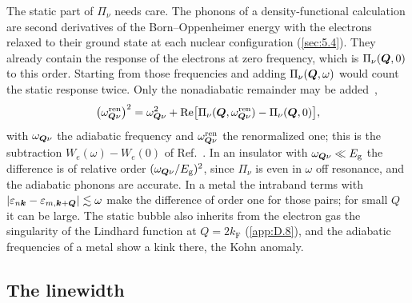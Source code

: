 The static part of $\Pi_\nu$ needs care. The phonons of a density-functional calculation are second derivatives of the Born--Oppenheimer energy with the electrons relaxed to their ground state at each nuclear configuration (\cref{sec:5.4}). They already contain the response of the electrons at zero frequency, which is $\Pi_\nu(\bm{Q},0)$ to this order. Starting from those frequencies and adding $\Pi_\nu(\bm{Q},\omega)$ would count the static response twice. Only the nonadiabatic remainder may be added~\cite{calandra2010adiabatic},
\begin{equation}
  \bigl(\omega^{\mathrm{ren}}_{\bm{Q}\nu}\bigr)^2 = \omega_{\bm{Q}\nu}^2 + \operatorname{Re}\bigl[\Pi_\nu(\bm{Q},\omega^{\mathrm{ren}}_{\bm{Q}\nu}) - \Pi_\nu(\bm{Q},0)\bigr] ,
  \label{eq:D.17-nonad}
\end{equation}
with $\omega_{\bm{Q}\nu}$ the adiabatic frequency and $\omega^{\mathrm{ren}}_{\bm{Q}\nu}$ the renormalized one; this is the subtraction $W_e(\omega) - W_e(0)$ of Ref.~\cite[Eq.~(140)]{giustino2017electron}. In an insulator with $\omega_{\bm{Q}\nu} \ll E_{\mathrm{g}}$ the difference is of relative order $(\omega_{\bm{Q}\nu}/E_{\mathrm{g}})^2$, since $\Pi_\nu$ is even in $\omega$ off resonance, and the adiabatic phonons are accurate. In a metal the intraband terms with $|\varepsilon_{n\bm{k}} - \varepsilon_{m,\bm{k}+\bm{Q}}| \lesssim \omega$ make the difference of order one for those pairs; for small $Q$ it can be large. The static bubble also inherits from the electron gas the singularity of the Lindhard function at $Q = 2k_{\mathrm{F}}$ (\cref{app:D.8}), and the adiabatic frequencies of a metal show a kink there, the Kohn anomaly.

\subsection*{The linewidth}


